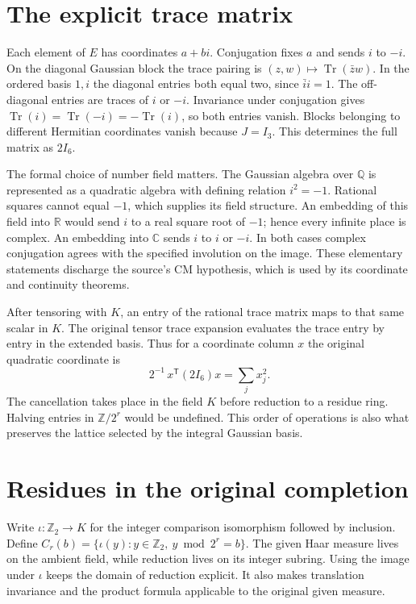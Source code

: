 \documentclass[12pt,letterpaper]{article}
\begin{document}
\section{The explicit trace matrix}
Each element of $E$ has coordinates $a+bi$. Conjugation fixes $a$ and sends $i$ to $-i$. On the diagonal Gaussian block the trace pairing is $(z,w)\mapsto\operatorname{Tr}(\bar z w)$. In the ordered basis $1,i$ the diagonal entries both equal two, since $\bar i i=1$. The off-diagonal entries are traces of $i$ or $-i$. Invariance under conjugation gives $\operatorname{Tr}(i)=\operatorname{Tr}(-i)=-\operatorname{Tr}(i)$, so both entries vanish. Blocks belonging to different Hermitian coordinates vanish because $J=I_3$. This determines the full matrix as $2I_6$.

The formal choice of number field matters. The Gaussian algebra over $\mathbb Q$ is represented as a quadratic algebra with defining relation $i^2=-1$. Rational squares cannot equal $-1$, which supplies its field structure. An embedding of this field into $\mathbb R$ would send $i$ to a real square root of $-1$; hence every infinite place is complex. An embedding into $\mathbb C$ sends $i$ to $i$ or $-i$. In both cases complex conjugation agrees with the specified involution on the image. These elementary statements discharge the source's CM hypothesis, which is used by its coordinate and continuity theorems.

After tensoring with $K$, an entry of the rational trace matrix maps to that same scalar in $K$. The original tensor trace expansion evaluates the trace entry by entry in the extended basis. Thus for a coordinate column $x$ the original quadratic coordinate is
\[
  2^{-1}\, x^{\mathsf T}(2I_6)x=\sum_j x_j^2.
\]
The cancellation takes place in the field $K$ before reduction to a residue ring. Halving entries in $\mathbb Z/2^r$ would be undefined. This order of operations is also what preserves the lattice selected by the integral Gaussian basis.
\section{Residues in the original completion}
Write $\iota:\mathbb Z_2\to K$ for the integer comparison isomorphism followed by inclusion. Define $C_r(b)=\{\iota(y):y\in\mathbb Z_2,\ y\bmod 2^r=b\}$. The given Haar measure lives on the ambient field, while reduction lives on its integer subring. Using the image under $\iota$ keeps the domain of reduction explicit. It also makes translation invariance and the product formula applicable to the original given measure.
\end{document}
